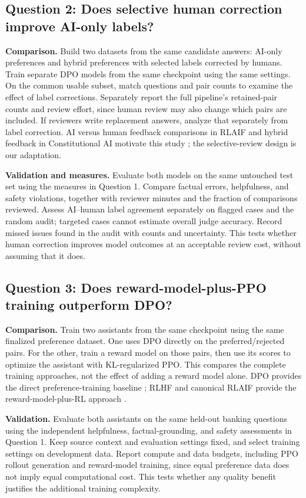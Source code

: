 \documentclass[11pt]{article}
\begin{document}
\subsection{Question 2: Does selective human correction improve AI-only labels?}
\textbf{Comparison.} Build two datasets from the same candidate answers: AI-only preferences and hybrid preferences with selected labels corrected by humans. Train separate DPO models from the same checkpoint using the same settings. On the common usable subset, match questions and pair counts to examine the effect of label corrections. Separately report the full pipeline's retained-pair counts and review effort, since human review may also change which pairs are included. If reviewers write replacement answers, analyze that separately from label correction. AI versus human feedback comparisons in RLAIF and hybrid feedback in Constitutional AI motivate this study \cite{rlaif,cai}; the selective-review design is our adaptation.

\textbf{Validation and measures.} Evaluate both models on the same untouched test set using the measures in Question 1. Compare factual errors, helpfulness, and safety violations, together with reviewer minutes and the fraction of comparisons reviewed. Assess AI--human label agreement separately on flagged cases and the random audit; targeted cases cannot estimate overall judge accuracy. Record missed issues found in the audit with counts and uncertainty. This tests whether human correction improves model outcomes at an acceptable review cost, without assuming that it does.

\subsection{Question 3: Does reward-model-plus-PPO training outperform DPO?}
\textbf{Comparison.} Train two assistants from the same checkpoint using the same finalized preference dataset. One uses DPO directly on the preferred/rejected pairs. For the other, train a reward model on those pairs, then use its scores to optimize the assistant with KL-regularized PPO. This compares the complete training approaches, not the effect of adding a reward model alone. DPO provides the direct preference-training baseline \cite{dpo}; RLHF and canonical RLAIF provide the reward-model-plus-RL approach \cite{rlhf,rlaif}.

\textbf{Validation.} Evaluate both assistants on the same held-out banking questions using the independent helpfulness, factual-grounding, and safety assessments in Question 1. Keep source context and evaluation settings fixed, and select training settings on development data. Report compute and data budgets, including PPO rollout generation and reward-model training, since equal preference data does not imply equal computational cost. This tests whether any quality benefit justifies the additional training complexity.
\end{document}
